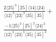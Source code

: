 \documentclass[varwidth, border=5pt]{standalone}
\begin{document}
\begin{my}
$\begin{gathered}
\scriptscriptstyle\frac{2⟨25⟩^3[25]⟨14⟩⟨24⟩}{⟨12⟩^3⟨23⟩^2⟨35⟩[35]}+\\
\scriptscriptstyle\frac{-1⟨25⟩^3[25]^2⟨24⟩^2}{⟨12⟩^2⟨23⟩^3⟨35⟩[35]^2}\phantom{+}
\end{gathered}$
\end{my}
\end{document}
